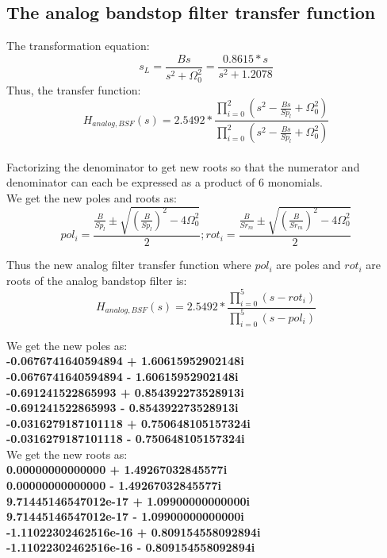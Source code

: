 \documentclass[12pt]{article}
\begin{document}
\subsection{The analog bandstop filter transfer function}
The transformation equation:
\begin{equation}
    s_L= \frac{Bs}{s^2+\Omega_{0}^2} = \frac{0.8615*s}{s^2+1.2078}
\end{equation}
Thus, the transfer function:
\begin{equation}
    H_{analog,BSF}(s)=2.5492*\frac{\prod_{i=0}^{2}(s^2-\frac{Bs}{Sp_l}+\Omega_{0}^2)}{\prod_{i=0}^{2}(s^2-\frac{Bs}{Sp_l}+\Omega_{0}^2)} 
\end{equation}
\\Factorizing the denominator to get new roots so that the numerator and denominator can each be expressed as a product of 6 monomials.
\\We get the new poles and roots as:
\begin{equation}
    pol_i=\frac{\frac{B}{Sp_l}\pm \sqrt{(\frac{B}{Sp_l})^2-4\Omega_{0}^2}}{2};rot_i=\frac{\frac{B}{Sr_m}\pm \sqrt{(\frac{B}{Sr_m})^2-4\Omega_{0}^2}}{2}
\end{equation}

    

Thus the new analog filter transfer function where $pol_i$ are poles and $rot_i$ are roots of the analog bandstop filter is:
\begin{equation}
    H_{analog,BSF}(s)=2.5492*\frac{\prod_{i=0}^{5}(s-rot_i)}{\prod_{i=0}^{5}(s-pol_i)} 
\end{equation}

We get the new poles as: \textbf{\\-0.0676741640594894 + 1.60615952902148i
\\-0.0676741640594894 - 1.60615952902148i
\\-0.691241522865993 + 0.854392273528913i
\\-0.691241522865993 - 0.854392273528913i
\\-0.0316279187101118 + 0.750648105157324i
\\-0.0316279187101118 - 0.750648105157324i}
\\We get the new roots as: \textbf{\\0.00000000000000 + 1.49267032845577i
\\0.00000000000000 - 1.49267032845577i
\\9.71445146547012e-17 + 1.09900000000000i
\\9.71445146547012e-17 - 1.09900000000000i
\\-1.11022302462516e-16 + 0.809154558092894i
\\-1.11022302462516e-16 - 0.809154558092894i}
    
\end{document}
